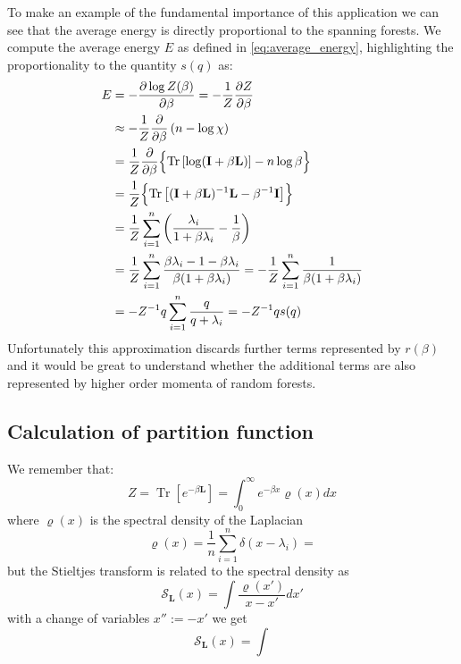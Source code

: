 \documentclass[10pt,aps,pre,twocolumn,nofootinbib,superscriptaddress,longbibliography]{revtex4-1}
\newcommand{\bI}{\mathbf{I}}
\newcommand{\bL}{\mathbf{L}}
\newcommand{\Tr}[1]{\operatorname{Tr}\left\lbrack #1\right\rbrack}
\begin{document}
To make an example of the fundamental importance of this application we can see that the average energy is directly proportional to the spanning forests.
We compute the average energy $E$ as defined in \ref{eq:average_energy}, highlighting the proportionality to the quantity $s(q)$ as:
\begin{align}
E &=-\frac{\partial \log Z(\beta)}{\partial \beta} =-\frac{1}{Z} \frac{\partial Z}{\partial \beta} \\
  &\approx -\frac{1}{Z} \frac{\partial }{\partial \beta}\left(n - \log \chi \right) \\
  &=\frac{1}{Z} \frac{\partial}{\partial \beta} \Bigl \{\Tr{\log(\bI+\beta \bL)} -n\log \beta \Bigr \} \\
  &=\frac{1}{Z}\Bigl\{  \Tr{(\bI+\beta \bL)^{-1} \bL - \beta^{-1}\bI}  \Bigr\} \\
  &=\frac{1}{Z} \sum_{i=1}^n\left( \frac{\lambda_i}{1+\beta \lambda_i} - \frac{1}{\beta}\right) \\
  &=\frac{1}{Z} \sum_{i=1}^n \frac{\beta \lambda_i - 1 - \beta \lambda_i}{\beta(1+\beta \lambda_i)} =-\frac{1}{Z} \sum_{i=1}^n \frac{1}{\beta(1+\beta \lambda_i)} \\ 
  &=-Z^{-1} q \sum_{i=1}^n \frac{q}{q+\lambda_i} = -Z^{-1} q s(q)
\end{align}
Unfortunately this approximation discards further terms represented by $r(\beta)$ and it would be great to understand whether the additional terms are also represented by higher order momenta of random forests.
\subsection{Calculation of partition function}
We remember that: 
\begin{equation}
    Z=\Tr{e^{-\beta \bL}} = \int_{0}^{\infty} e^{-\beta x} \varrho(x) dx
\end{equation}
where $\varrho(x)$ is the spectral density of the Laplacian
\begin{equation}
    \varrho(x) = \frac{1}{n}\sum_{i=1}^n \delta(x-\lambda_i) = 
\end{equation}
but the Stieltjes transform is related to the spectral density as
\begin{equation}
\mathcal{S}_{\bL}(x) = \int \frac{\varrho(x')}{x-x'} dx'
\end{equation}
with a change of variables $x'':=-x'$ we get
\begin{equation}
    \mathcal{S}_{\bL}(x) = \int 
\end{equation}
\end{document}
